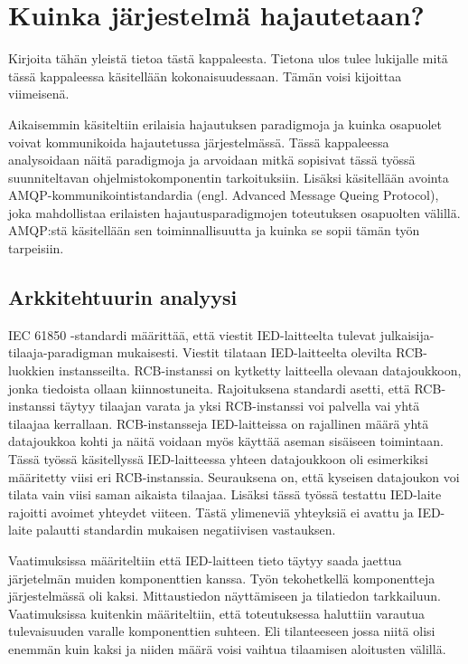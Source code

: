\chapter{Kuinka järjestelmä hajautetaan?}
\begin{it}
	Kirjoita tähän yleistä tietoa tästä kappaleesta. Tietona ulos tulee lukijalle mitä tässä kappaleessa käsitellään kokonaisuudessaan. Tämän voisi kijoittaa viimeisenä.
\end{it}
Aikaisemmin käsiteltiin erilaisia hajautuksen paradigmoja ja kuinka osapuolet voivat kommunikoida hajautetussa järjestelmässä. Tässä kappaleessa analysoidaan näitä paradigmoja ja arvoidaan mitkä sopisivat tässä työssä suunniteltavan ohjelmistokomponentin tarkoituksiin. Lisäksi käsitellään avointa AMQP-kommunikointistandardia (engl. Advanced Message Queing Protocol), joka mahdollistaa erilaisten hajautusparadigmojen toteutuksen osapuolten välillä. AMQP:stä käsitellään sen toiminnallisuutta ja kuinka se sopii tämän työn tarpeisiin.



\section{Arkkitehtuurin analyysi}
\label{ch:architecture-analysis}
IEC 61850 -standardi määrittää, että viestit IED-laitteelta tulevat julkaisija-tilaaja-pa\-ra\-dig\-man mukaisesti. Viestit tilataan IED-laitteelta olevilta RCB-luokkien instansseilta. RCB-instanssi on kytketty laitteella olevaan datajoukkoon, jonka tiedoista ollaan kiinnostuneita. Rajoituksena standardi asetti, että RCB-instanssi täytyy tilaajan varata ja yksi RCB-instanssi voi palvella vai yhtä tilaajaa kerrallaan. RCB-instansseja IED-laitteissa on rajallinen määrä yhtä datajoukkoa kohti ja näitä voidaan myös käyttää aseman sisäiseen toimintaan. Tässä työssä käsitellyssä IED-laitteessa yhteen datajoukkoon oli esimerkiksi määritetty viisi eri RCB-instanssia. Seurauksena on, että kyseisen datajoukon voi tilata vain viisi saman aikaista tilaajaa. Lisäksi tässä työssä testattu IED-laite rajoitti avoimet yhteydet viiteen. Tästä ylimeneviä yhteyksiä ei avattu ja IED-laite palautti standardin mukaisen negatiivisen vastauksen.

Vaatimuksissa määriteltiin että IED-laitteen tieto täytyy saada jaettua järjetelmän muiden komponenttien kanssa. Työn tekohetkellä komponentteja järjestelmässä oli kaksi. Mittaustiedon näyttämiseen ja tilatiedon tarkkailuun. Vaatimuksissa kuitenkin määriteltiin, että toteutuksessa haluttiin varautua tulevaisuuden varalle komponenttien suhteen. Eli tilanteeseen jossa niitä olisi enemmän kuin kaksi ja niiden määrä voisi vaihtua tilaamisen aloitusten välillä. 

